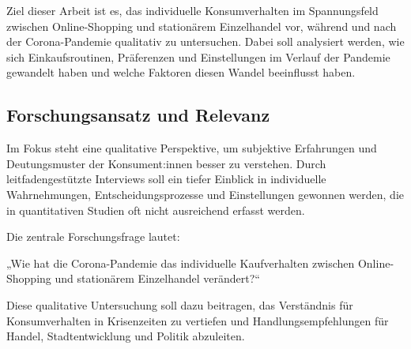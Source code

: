 Ziel dieser Arbeit ist es, das individuelle Konsumverhalten im Spannungsfeld zwischen Online-Shopping und stationärem Einzelhandel vor, während und nach der Corona-Pandemie qualitativ zu untersuchen. Dabei soll analysiert werden, wie sich Einkaufsroutinen, Präferenzen und Einstellungen im Verlauf der Pandemie gewandelt haben und welche Faktoren diesen Wandel beeinflusst haben. 

\subsection{Forschungsansatz und Relevanz}
Im Fokus steht eine qualitative Perspektive, um subjektive Erfahrungen und Deutungsmuster der Konsument:innen besser zu verstehen. Durch leitfadengestützte Interviews soll ein tiefer Einblick in individuelle Wahrnehmungen, Entscheidungsprozesse und Einstellungen gewonnen werden, die in quantitativen Studien oft nicht ausreichend erfasst werden. 

Die zentrale Forschungsfrage lautet: 

„Wie hat die Corona-Pandemie das individuelle Kaufverhalten zwischen Online-Shopping und stationärem Einzelhandel verändert?“ 

Diese qualitative Untersuchung soll dazu beitragen, das Verständnis für Konsumverhalten in Krisenzeiten zu vertiefen und Handlungsempfehlungen für Handel, Stadtentwicklung und Politik abzuleiten. 